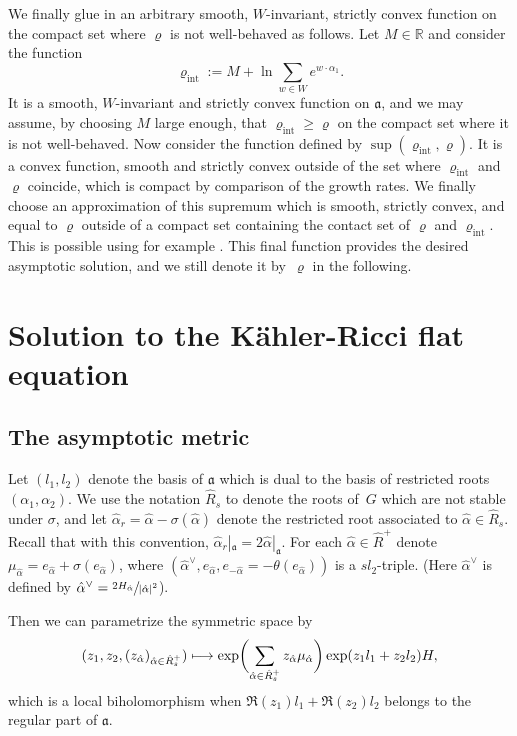 \documentclass[10pt]{amsart}
\def\mto{\mathchoice{\longmapsto}{\mapsto}{\mapsto}{\mapsto}}
\theoremstyle{plain}
\theoremstyle{definition}
\newcommand{\fa}{\mathfrak{a}}
\newcommand{\ha}{\hat{\alpha}}
\newcommand{\Roots}{\hat{R}}
\begin{document}
We finally glue in an arbitrary smooth, $W$-invariant, strictly convex function on the compact
set where $\varrho$ is not well-behaved as follows.
Let $M\in \mathbb{R}$ and consider the function
\begin{equation*}
\varrho_{\mathrm{int}}:=M+\ln\sum_{w\in W}e^{w\cdot\alpha_1}.
\end{equation*}
It is a smooth, $W$-invariant and strictly convex function on $\mathfrak{a}$,
and we may assume, by choosing $M$ large enough, that
$\varrho_{\mathrm{int}}\geq \varrho$
on the compact set where it is not well-behaved.
Now consider the function defined by $\sup(\varrho_{\mathrm{int}},\varrho)$.
It is a convex function, smooth and strictly convex outside of the set where
$\varrho_{\mathrm{int}}$ and $\varrho$ coincide, which is compact by comparison
of the growth rates.
We finally choose an approximation of this supremum which is
smooth, strictly convex, and equal to $\varrho$ outside of a compact set containing
the contact set of $\varrho$ and $\varrho_{\mathrm{int}}$.
This is possible using for example \cite{Gho02}.
This final function provides the desired asymptotic solution, and we still denote
it by~$\varrho$ in the following.

\section{Solution to the Kähler-Ricci flat equation}
\label{sec:solut-kahl-ricci}

\subsection{The asymptotic metric}

Let $(l_1,l_2)$ denote the basis of $\fa$ which is dual to the basis of restricted roots $(\alpha_1,\alpha_2)$.
We use the notation $\Roots_s$ to denote the roots of~$G$ which are not stable under $\sigma$,
and let $\ha_r=\ha-\sigma(\ha)$ denote the restricted root associated to $\ha\in\Roots_s$.
Recall that with this convention, $\ha_r|_{\fa}=2\ha|_{\fa}$.
For each $\ha\in \Roots^+$ denote $\mu_{\ha}=e_{\ha}+\sigma(e_{\ha})$, where $(\ha^\vee,e_{\ha},e_{-\ha}=-\theta(e_{\ha}))$ is a $sl_2$-triple.
(Here $\ha^\vee$ is defined by $\ha^\vee=\sfrac{2H_{\ha}}{|\ha|^2}$).

Then we can parametrize the symmetric space by
\begin{equation}
(z_1,z_2,(z_{\ha})_{\ha\in \Roots_s^+}) \mto \exp\biggl( \sum_{\ha\in \Roots_s^+} z_{\ha} \mu_{\ha} \biggr) \exp(z_1 l_1 + z_2 l_2) H,\label{eq:24}
\end{equation}
which is a local biholomorphism when $\Re(z_1) l_1+\Re(z_2)l_2$ belongs to the regular part of $\fa$.
\end{document}
